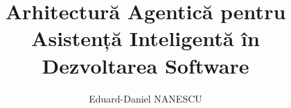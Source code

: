 \documentclass[12pt, a4paper, oneside, romanian, draft]{teza-upb}
\begin{document}
\author{Eduard-Daniel NANESCU}
\title{Arhitectură Agentică pentru Asistență Inteligentă în Dezvoltarea Software}

\makeatletter

\renewcommand{\projectdescription} {

  \newpage
  \thispagestyle{empty}

  \noindent

  \begin{minipage}[t]{0.75\textwidth}
    Universitatea Națională de Știință și Tehnologie POLITEHNICA București\\
    Facultatea de Electronică, Telecomunicații și Tehnologia Informației\\
    Program de studiu \textbf{INF}
  \end{minipage}%

  \begin{minipage}[t]{0.25\textwidth}
    \raggedleft
    \textbf{}
  \end{minipage}

  \vspace{1cm}

  \begin{center}
    \textbf{TEMA PROIECTULUI DE DIPLOMĂ}\\
    a studentului \textbf{\@author, \@grupa}
  \end{center}

  \vspace{0.5cm}

  \noindent \textbf{1. Titlul temei:} \@title

  \vspace{0.4cm}

}
\end{document}
